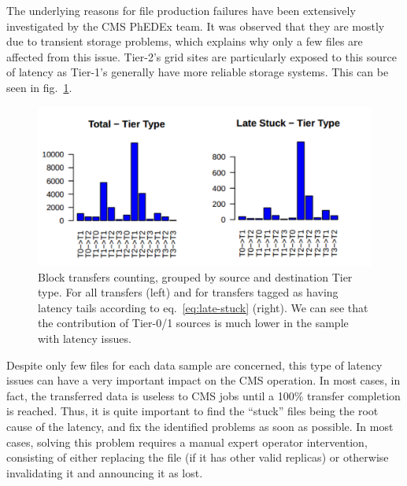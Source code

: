 The underlying reasons for file production failures have been
extensively investigated by the CMS PhEDEx team.  It was observed that
they are mostly due to transient storage problems, which explains why
only a few files are affected from this issue. Tier-2's grid sites are
particularly exposed to this source of latency as Tier-1's generally
have more reliable storage systems. This can be seen in
fig.~\ref{fig:figure-5.3}.

\begin{figure}[htp]
\centering
\includegraphics{Figures/figure-53.pdf}
\caption{Block transfers counting, grouped by source and destination
  Tier type. For all transfers (left) and for transfers tagged as having
  latency tails according to eq.~\ref{eq:late-stuck} (right). We can
  see that the contribution of Tier-0/1 sources is much
  lower in the sample with latency issues.}\label{fig:figure-5.3}
\end{figure}


Despite only few files for each data sample are concerned, this type
of latency issues can have a very important impact on the CMS
operation. In most cases, in fact, the transferred data is useless to
CMS jobs until a 100\% transfer completion is reached. Thus, it is
quite important to find the “stuck” files being the root cause of the
latency, and fix the identified problems as soon as possible. In most
cases, solving this problem requires a manual expert operator
intervention, consisting of either replacing the file (if it has other
valid replicas) or otherwise invalidating it and announcing it as
lost.
